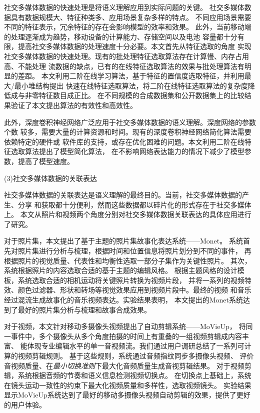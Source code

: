 \documentclass[doctor]{ustcthesis}
\begin{document}
社交多媒体数据的快速处理是将语义理解应用到实际问题的关键。
社交多媒体数据具有数据规模大、特征种类多、应用场景复杂多样的特点。
不同应用场景需要不同的特征表示，冗余特征的存在会影响模型的效率和效果。
此外，当前移动端的处理逐渐成为趋势，移动设备的计算能力、存储空间以及电池
容量都十分有限，提高社交多媒体数据的处理速度十分必要。本文首先从特征选取的角度
实现社交多媒体数据的快速处理。现有的批处理特征选取算法存在计算慢、内存占用高、不能处理
流数据的缺点，已有的在线特征选取算法的效果与批处理算法有明显的差距。
本文利用二阶在线学习算法，基于特征的置信度选取特征，并利用最大/最小堆结构提出
快速在线特征选取算法，将二阶在线特征选取算法的复杂度降低成与非零特征数目成正比。
在不同规模的合成数据集和公开数据集上的比较结果验证了本文提出算法的有效性和高效性。

此外，深度卷积神经网络广泛应用于社交多媒体数据的语义理解。深度网络的参数个数
较多，需要大量的计算资源和时间。现有的深度卷积神经网络简化算法需要依赖特定的硬件或
软件库的支持，或存在优化困难的问题。本文利用二阶在线特征选取算法提出了模型简化算法，
在不影响网络表达能力的情况下减少了模型参数，提高了模型速度。

(3)社交多媒体数据的关联表达

社交多媒体数据的关联表达是语义理解的最终目的。当前，社交多媒体数据的产生、分享
和获取都十分便利，然而这些数据都以碎片化的形式存在于社交多媒体上。
本文从照片和视频两个角度分别对社交多媒体数据关联表达的具体应用进行了研究。

对于照片集，本文提出了基于主题的照片集故事化表达系统——Monet。
系统首先对照片集进行分析与梳理，根据时间和位置信息将照片划分到不同的事件，
再根据照片的视觉质量、代表性和均衡性选取一部分子集作为关键性照片。
其次，系统根据照片的内容选取合适的基于主题的编辑风格。
根据主题风格的设计模板，系统选取合适的相机运动将关键照片转换为视频片段，
并将一系列的视频特效、颜色过滤器、形状和转场等视觉效果应用到视频片段中。最终的视频
和音乐经过混流生成故事化的音乐视频表达。实验结果表明，
本文提出的Monet系统达到了最好的照片集分析与梳理和故事合成效果。

对于视频，本文针对移动多摄像头视频提出了自动剪辑系统——MoVieUp，
将同一事件中，多个摄像头从多个角度拍摄的时间上有重叠的一组视频剪辑成内容丰富、
能体现专业编辑水平的单一音视频流。我们通过用户调研总结了一系列可计算的视频剪辑规则。
基于这些规则，系统通过音频指纹同步多摄像头视频、
评价音视频质量、在\emph{最小切换准则}下最大化音频质量生成音视剪辑结果。
对于视频剪辑，系统根据音频的节奏和语义信息检测视频切换点。
在切换点上基础上，系统在镜头运动一致性的约束下最大化视频质量和多样性，选取视频镜头。
实验结果显示MoVieUp系统达到了最好的移动多摄像头视频自动剪辑的效果，提供了更好的用户体验。
\end{document}
